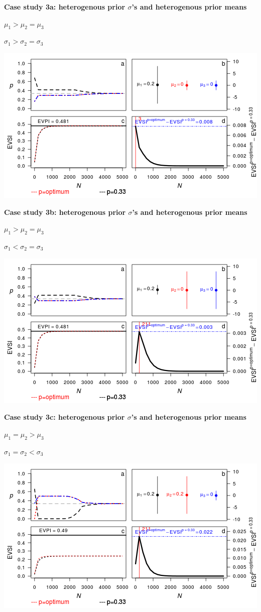 \textbf{Case study 3a: heterogenous prior \(\sigma\)'s and heterogenous
prior means}

\(\mu_1 > \mu_2 = \mu_3\)

\(\sigma_1 > \sigma_2 = \sigma_3\)

\includegraphics{figure/x100___1_1_1c-1.png} \clearpage

\textbf{Case study 3b: heterogenous prior \(\sigma\)'s and heterogenous
prior means}

\(\mu_1 > \mu_2 = \mu_3\)

\(\sigma_1 < \sigma_2 = \sigma_3\)

\includegraphics{figure/x1001_1_1c-1.png} \clearpage

\textbf{Case study 3c: heterogenous prior \(\sigma\)'s and heterogenous
prior means}

\(\mu_1 = \mu_2 > \mu_3\)

\(\sigma_1 = \sigma_2 < \sigma_3\)

\includegraphics{figure/x110__1__1_1c-1.png} \clearpage

